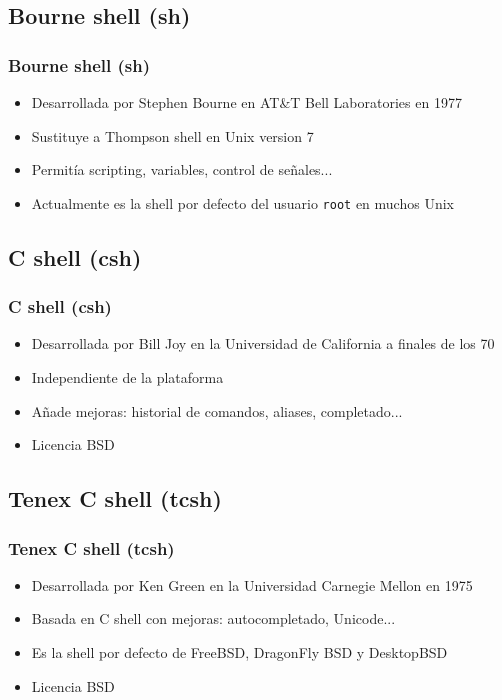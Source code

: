 \documentclass{beamer}
\begin{document}
\subsection{Bourne shell (sh)}

\begin{frame}
  \frametitle{Bourne shell (sh)}
  \begin{itemize}
    \item Desarrollada por Stephen Bourne en AT\&T Bell Laboratories en 1977
    \item Sustituye a Thompson shell en Unix version 7
    \medskip
    \item Permitía scripting, variables, control de señales...
    \medskip
    \item Actualmente es la shell por defecto del usuario \texttt{root} en muchos Unix
  \end{itemize}
\end{frame}

\subsection{C shell (csh)}

\begin{frame}
  \frametitle{C shell (csh)}
  \begin{itemize}
    \item Desarrollada por Bill Joy en la Universidad de California a finales de los 70
    \item Independiente de la plataforma
    \medskip
    \item Añade mejoras: historial de comandos, aliases, completado...
    \medskip
    \item Licencia BSD
  \end{itemize}
\end{frame}

\subsection{Tenex C shell (tcsh)}

\begin{frame}
  \frametitle{Tenex C shell (tcsh)}
  \begin{itemize}
    \item Desarrollada por Ken Green en la Universidad Carnegie Mellon en 1975
    \item Basada en C shell con mejoras: autocompletado, Unicode...
    \medskip
    \item Es la shell por defecto de FreeBSD, DragonFly BSD y DesktopBSD
    \medskip
    \item Licencia BSD
  \end{itemize}
\end{frame}
\end{document}
